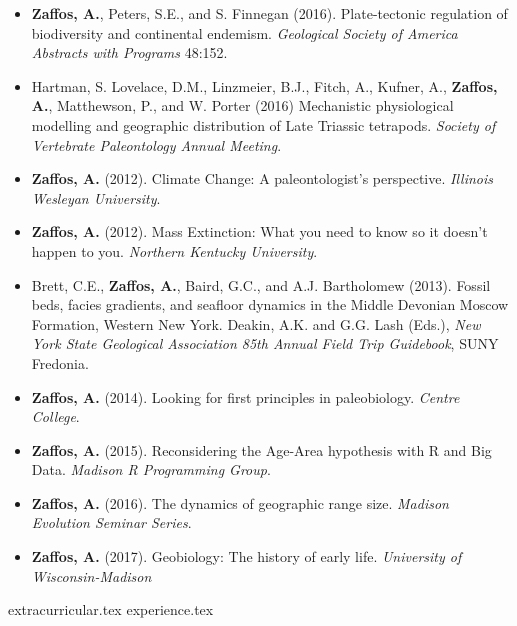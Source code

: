 \documentclass[12pt, a4paper]{awesome-cv}
\newcommand*{\sectiondir}{resume/}
\begin{document}
\begin{itemize}[leftmargin=*]
\item{\textbf{Zaffos, A.}, Peters, S.E., and S. Finnegan (2016). Plate-tectonic regulation of biodiversity and continental endemism. \textit{Geological Society of America Abstracts with Programs} 48:152.}
\item{Hartman, S. Lovelace, D.M., Linzmeier, B.J., Fitch, A., Kufner, A., \textbf{Zaffos, A.}, Matthewson, P., and W. Porter (2016) Mechanistic physiological modelling and geographic distribution of Late Triassic tetrapods. \textit{Society of Vertebrate Paleontology Annual Meeting}.}
\end{itemize}

\fontsize{10pt}{1em}\bodyfontlight\upshape\color{text}
\begin{itemize}[leftmargin=*]
\item{\textbf{Zaffos, A.} (2012). Climate Change: A paleontologist's perspective. \textit{Illinois Wesleyan University}.}
\item{\textbf{Zaffos, A.} (2012). Mass Extinction: What you need to know so it doesn't happen to you. \textit{Northern Kentucky University}.}
\item{Brett, C.E., \textbf{Zaffos, A.}, Baird, G.C., and A.J. Bartholomew (2013). Fossil beds, facies gradients, and seafloor dynamics in the Middle Devonian Moscow Formation, Western New York. Deakin, A.K. and G.G. Lash (Eds.), \textit{New York State Geological Association 85th Annual Field Trip Guidebook}, SUNY Fredonia.}
\item{\textbf{Zaffos, A.} (2014). Looking for first principles in paleobiology. \textit{Centre College}.}
\item{\textbf{Zaffos, A.} (2015). Reconsidering the Age-Area hypothesis with R and Big Data. \textit{Madison R Programming Group}.}
\item{\textbf{Zaffos, A.} (2016). The dynamics of geographic range size. \textit{Madison Evolution Seminar Series}.}
\item{\textbf{Zaffos, A.} (2017). Geobiology: The history of early life. \textit{University of Wisconsin-Madison}}
\end{itemize}

{extracurricular.tex}
\vspace{-20pt}
{experience.tex}
\vspace{-20pt}
\end{document}
